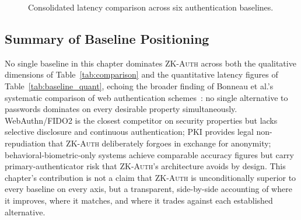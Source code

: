 \documentclass[12pt,a4paper,oneside]{report}
\newcommand{\simplebar}[6]{%
  \draw[fill=#5,draw=black!60] (#1,0) rectangle ++(#3,#4);%
  \node[barlabel,above] at (#1+0.5*#3,#4) {#6};%
}
\begin{document}
\begin{figure}[htbp]
\centering
{}
\caption{Consolidated latency comparison across six authentication baselines.}
\label{fig:baseline_chart}
\end{figure}

\subsection{Summary of Baseline Positioning}
\label{sec:summary_baseline}

No single baseline in this chapter dominates \textsc{ZK-Auth} across
both the qualitative dimensions of Table~\ref{tab:comparison} and the
quantitative latency figures of Table~\ref{tab:baseline_quant}, echoing
the broader finding of Bonneau et al.'s systematic comparison of web
authentication schemes~\cite{bonneau12}: no single alternative to
passwords dominates on every desirable property simultaneously.
WebAuthn/FIDO2 is the closest competitor on security properties but
lacks selective disclosure and continuous authentication; PKI provides
legal non-repudiation that \textsc{ZK-Auth} deliberately forgoes in
exchange for anonymity; behavioral-biometric-only systems achieve
comparable accuracy figures but carry primary-authenticator risk that
\textsc{ZK-Auth}'s architecture avoids by design. This chapter's
contribution is not a claim that \textsc{ZK-Auth} is unconditionally
superior to every baseline on every axis, but a transparent,
side-by-side accounting of where it improves, where it matches, and
where it trades against each established alternative.
\end{document}
